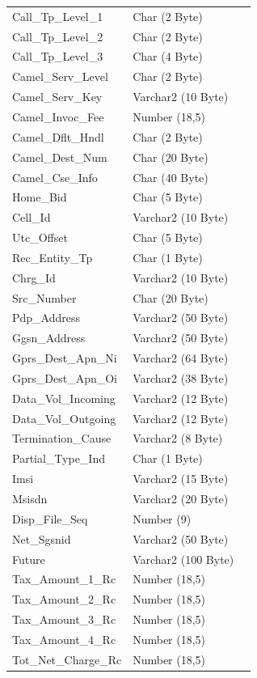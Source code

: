 \documentclass[12pt,twoside]{article}
\begin{document}
\begin{longtable}{l|l|l}
Call\_Tp\_Level\_1 & Char (2 Byte) & \\
Call\_Tp\_Level\_2 & Char (2 Byte) & \\
Call\_Tp\_Level\_3 & Char (4 Byte) & \\
Camel\_Serv\_Level & Char (2 Byte) & \\
Camel\_Serv\_Key & Varchar2 (10 Byte) & \\
Camel\_Invoc\_Fee & Number (18,5) & \\
Camel\_Dflt\_Hndl & Char (2 Byte) & \\
Camel\_Dest\_Num & Char (20 Byte) & \\
Camel\_Cse\_Info & Char (40 Byte) & \\
Home\_Bid & Char (5 Byte) & \\
Cell\_Id & Varchar2 (10 Byte) & \\
Utc\_Offset & Char (5 Byte) & \\
Rec\_Entity\_Tp & Char (1 Byte) & \\
Chrg\_Id & Varchar2 (10 Byte) & \\
Src\_Number & Char (20 Byte) & \\
Pdp\_Address & Varchar2 (50 Byte) & \\
Ggsn\_Address & Varchar2 (50 Byte) & \\
Gprs\_Dest\_Apn\_Ni & Varchar2 (64 Byte) & \\
Gprs\_Dest\_Apn\_Oi & Varchar2 (38 Byte) & \\
Data\_Vol\_Incoming & Varchar2 (12 Byte) & \\
Data\_Vol\_Outgoing & Varchar2 (12 Byte) & \\
Termination\_Cause & Varchar2 (8 Byte) & \\
Partial\_Type\_Ind & Char (1 Byte) & \\
Imsi & Varchar2 (15 Byte) & \\
Msisdn & Varchar2 (20 Byte) & \\
Disp\_File\_Seq & Number (9) & \\
Net\_Sgsnid & Varchar2 (50 Byte) & \\
Future & Varchar2 (100 Byte) & \\
Tax\_Amount\_1\_Rc & Number (18,5) & \\
Tax\_Amount\_2\_Rc & Number (18,5) & \\
Tax\_Amount\_3\_Rc & Number (18,5) & \\
Tax\_Amount\_4\_Rc & Number (18,5) & \\
Tot\_Net\_Charge\_Rc & Number (18,5) & \\

\end{longtable}
\end{document}
